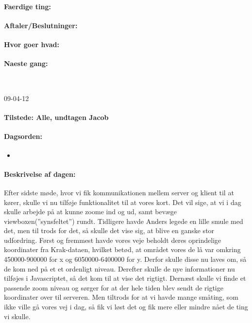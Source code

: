 \documentclass[a4paper,10pt,titlepage]{article}
\begin{document}
		\paragraph{Faerdige ting:}
		
		\paragraph{Aftaler/Beslutninger:}
		
		\paragraph{Hvor goer hvad:}
		
		\paragraph{Naeste gang:}\mbox{}\\
		
		\begin{center}
		09-04-12
		\end{center}
		
		\paragraph{Tilstede: Alle, undtagen Jacob}
		\paragraph{Dagsorden:}
		\begin{itemize}
					\item 
					
		\end{itemize}
		
		\paragraph{Beskrivelse af dagen:}
		Efter sidste møde, hvor vi fik kommunikationen mellem server og klient til at kører, skulle vi nu tilføje funktionalitet til at vores kort. Det vil sige, at vi i dag skulle arbejde på at kunne zoome ind og ud, samt bevæge viewboxen(”synsfeltet”) rundt. Tidligere havde Anders legede en lille smule med det, men til trods for det, så skulle det vise sig, at blive en ganske stor udfordring. Først og fremmest havde vores veje beholdt deres oprindelige koordinater fra Krak-dataen, hvilket betød, at området vores de lå var omkring 450000-900000 for x og 6050000-6400000 for y. Derfor skulle disse nu laves om, så de kom ned på et et ordenligt niveau. Derefter skulle de nye informationer nu tilføjes i Javascriptet, så det kom til at vise det rigtigt. Dernæst skulle vi finde et passende zoom niveau og sørger for at der hele tiden blev sendt de rigtige koordinater over til serveren. Men tiltrods for at vi havde mange småting, som ikke ville gå vores vej i dag, så fik vi løst det og fik mere eller mindre nået de ting vi skulle. 
\end{document}
